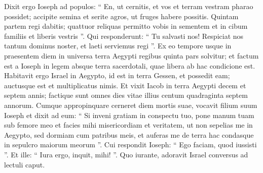 \begin{biblechapter}
\begin{biblechapter}
\begin{biblechapter}
\begin{biblechapter}
\begin{biblechapter}
\begin{biblechapter}
\begin{biblechapter}
\begin{biblechapter}
\begin{biblechapter}
\begin{biblechapter}
\begin{biblechapter}
\begin{biblechapter}
\begin{biblechapter}
\begin{biblechapter}
\begin{biblechapter}
\begin{biblechapter}
\begin{biblechapter}
\begin{biblechapter}
\begin{biblechapter}
\begin{biblechapter}
\begin{biblechapter}
\begin{biblechapter}
\begin{biblechapter}
\begin{biblechapter}
\begin{biblechapter}
\begin{biblechapter}
\begin{biblechapter}
\begin{biblechapter}
\begin{biblechapter}
\begin{biblechapter}
\begin{biblechapter}
\begin{biblechapter}
\begin{biblechapter}
\begin{biblechapter}
\begin{biblechapter}
\begin{biblechapter}
\begin{biblechapter}
\begin{biblechapter}
\begin{biblechapter}
\begin{biblechapter}
\begin{biblechapter}
\begin{biblechapter}
\begin{biblechapter}
\begin{biblechapter}
\begin{biblechapter}
\begin{biblechapter}
\begin{biblechapter}
 \verse Dixit ergo Ioseph ad populos: “ En, ut cernitis, et vos et terram vestram pharao possidet; accipite semina et serite agros, 
\verse ut fruges habere possitis. Quintam partem regi dabitis; quattuor reliquas permitto vobis in sementem et in cibum familiis et liberis vestris ”. 
\verse Qui responderunt: “ Tu salvasti nos! Respiciat nos tantum dominus noster, et laeti serviemus regi ”.
 \verse Ex eo tempore usque in praesentem diem in universa terra Aegypti regibus quinta pars solvitur; et factum est a Ioseph in legem absque terra sacerdotali, quae libera ab hac condicione est.
 \verse Habitavit ergo Israel in Aegypto, id est in terra Gessen, et possedit eam; auctusque est et multiplicatus nimis. 
\verse Et vixit Iacob in terra Aegypti decem et septem annis; factique sunt omnes dies vitae illius centum quadraginta septem annorum.
 \verse Cumque appropinquare cerneret diem mortis suae, vocavit filium suum Ioseph et dixit ad eum: “ Si inveni gratiam in conspectu tuo, pone manum tuam sub femore meo et facies mihi misericordiam et veritatem, ut non sepelias me in Aegypto, 
 \verse sed dormiam cum patribus meis, et auferas me de terra hac condasque in sepulcro maiorum meorum ”. Cui respondit Ioseph: “ Ego faciam, quod iussisti ”. 
 \verse Et ille: “ Iura ergo, inquit, mihi! ”. Quo iurante, adoravit Israel conversus ad lectuli caput.
 

\end{biblechapter}
\end{biblechapter}
\end{biblechapter}
\end{biblechapter}
\end{biblechapter}
\end{biblechapter}
\end{biblechapter}
\end{biblechapter}
\end{biblechapter}
\end{biblechapter}
\end{biblechapter}
\end{biblechapter}
\end{biblechapter}
\end{biblechapter}
\end{biblechapter}
\end{biblechapter}
\end{biblechapter}
\end{biblechapter}
\end{biblechapter}
\end{biblechapter}
\end{biblechapter}
\end{biblechapter}
\end{biblechapter}
\end{biblechapter}
\end{biblechapter}
\end{biblechapter}
\end{biblechapter}
\end{biblechapter}
\end{biblechapter}
\end{biblechapter}
\end{biblechapter}
\end{biblechapter}
\end{biblechapter}
\end{biblechapter}
\end{biblechapter}
\end{biblechapter}
\end{biblechapter}
\end{biblechapter}
\end{biblechapter}
\end{biblechapter}
\end{biblechapter}
\end{biblechapter}
\end{biblechapter}
\end{biblechapter}
\end{biblechapter}
\end{biblechapter}
\end{biblechapter}
